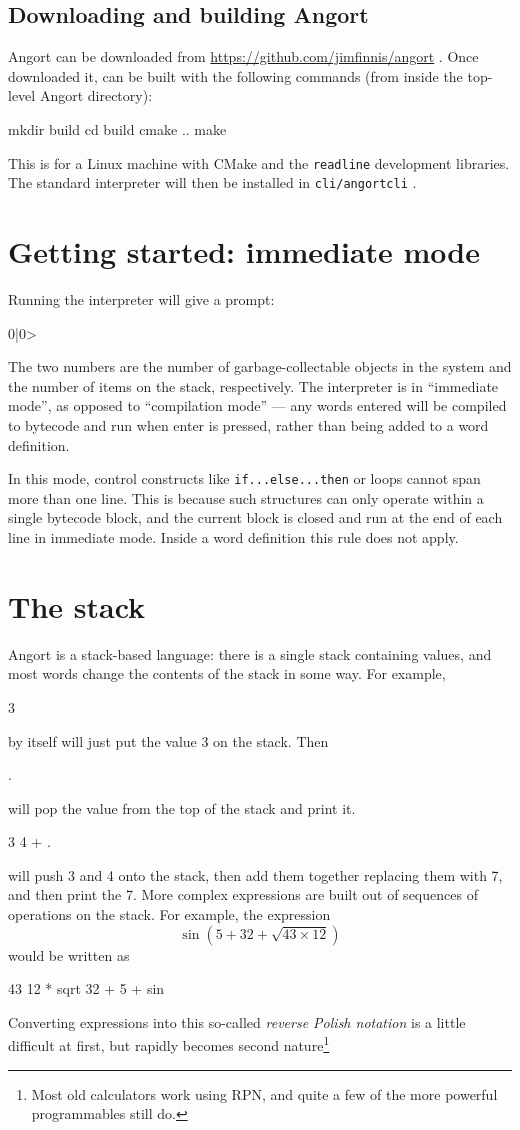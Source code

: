 \subsection{Downloading and building Angort}
Angort can be downloaded from \url{https://github.com/jimfinnis/angort} .
Once downloaded it, can be built with the following commands (from
inside the top-level Angort directory):
\begin{v}
mkdir build
cd build
cmake ..
make
\end{v}
This is for a Linux machine
with CMake and the \texttt{readline} development libraries. The standard
interpreter will then be installed in \texttt{cli/angortcli} .

\section{Getting started: immediate mode}
Running the interpreter will give a prompt:
\begin{v}
0|0>
\end{v}
The two numbers are the number of garbage-collectable objects in the
system and the number of items on the stack, respectively.
The interpreter is in ``immediate mode'', as opposed to ``compilation
mode'' --- any words entered will be compiled to bytecode and run when
enter is pressed,
rather than being added to a word definition.

In this mode, control constructs like
\texttt{if...else...then} or loops cannot span more than one
line. This is because such structures can only operate within a single 
bytecode block, and the current block is closed and run at the end of each
line in immediate mode. Inside a word definition this rule does not apply.


\section{The stack}
Angort is a stack-based language: there is a single stack containing
values, and most words change the contents
of the stack in some way. For example,
\begin{v}
3
\end{v}
by itself will just put the value 3 on the stack. Then
\begin{v}
.
\end{v}
will pop the value from the top of the stack and print it.
\begin{v}
3 4 + .
\end{v}
will push 3 and 4 onto the stack, then add them together replacing them
with 7, and then print the 7. More complex expressions are built 
out of sequences of operations on the stack. For example, the expression
\[
\sin(5+32+\sqrt{43 \times 12})
\]
would be written as
\begin{v}
43 12 * sqrt 32 + 5 + sin
\end{v}
Converting expressions into this so-called \emph{reverse Polish notation}
is a little difficult at first, but rapidly becomes second
nature\footnote{Most old calculators work using RPN, and quite a few
of the more powerful programmables still do.}

